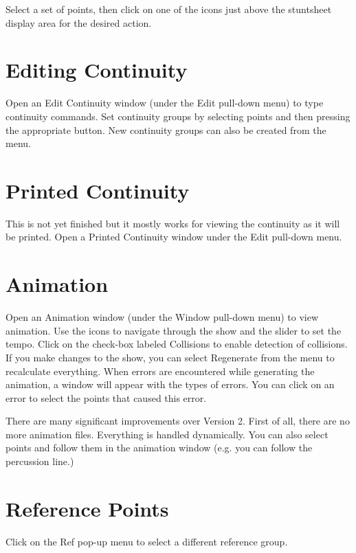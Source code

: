 Select a set of points, then click on one of the icons just above the
stuntsheet display area for the desired action.

\section{Editing Continuity}\label{editcont}

Open an Edit Continuity window (under the Edit pull-down menu) to type
continuity commands.  Set continuity groups by selecting points and then
pressing the appropriate button.  New continuity groups can also be
created from the menu.

\section{Printed Continuity}\label{printcont}

This is not yet finished but it mostly works for viewing the continuity
as it will be printed.  Open a Printed Continuity window under the Edit
pull-down menu.

\section{Animation}\label{animwin}

Open an Animation window (under the Window pull-down menu) to view animation.
Use the icons to navigate through the show and the slider to set the tempo.
Click on the check-box labeled Collisions to enable detection of collisions.
If you make changes to the show, you can select Regenerate from the menu
to recalculate everything.  When errors are encountered while generating
the animation, a window will appear with the types of errors.  You can
click on an error to select the points that caused this error.

There are many significant improvements over Version 2.  First of all,
there are no more animation files.  Everything is handled dynamically.
You can also select points and follow them in the animation window
(e.g. you can follow the percussion line.)

\section{Reference Points}\label{refpoints}

Click on the Ref pop-up menu to select a different reference group.

